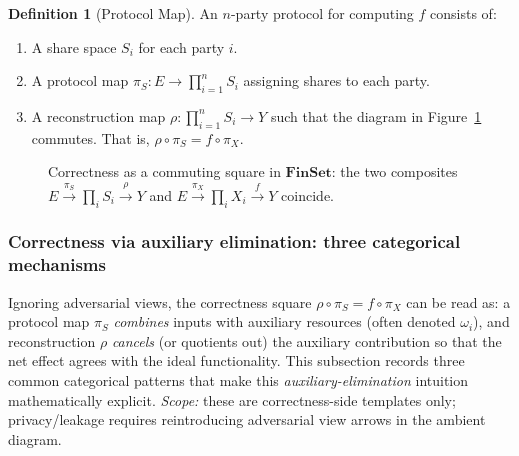 \documentclass[11pt,a4paper]{article}
\theoremstyle{definition}
\newtheorem{definition}{Definition}[section]
\theoremstyle{plain}
\begin{document}
\begin{definition}[Protocol Map]
\label{def:protocol-map}
An $n$-party protocol for computing $f$ consists of:
\begin{enumerate}
    \item A share space $S_i$ for each party $i$.
    \item A protocol map $\pi_S: E \to \prod_{i=1}^n S_i$ assigning shares to each party.
    \item A reconstruction map $\rho: \prod_{i=1}^n S_i \to Y$ such that the diagram in Figure~\ref{fig:protocol-correctness} commutes. That is, $\rho \circ \pi_S = f \circ \pi_X$.
\end{enumerate}
\begin{figure}[ht]
\centering
{}
\caption{Correctness as a commuting square in $\mathbf{FinSet}$: the two composites $E \xrightarrow{\pi_S} \prod_i S_i \xrightarrow{\rho} Y$ and $E \xrightarrow{\pi_X} \prod_i X_i \xrightarrow{f} Y$ coincide.}
\label{fig:protocol-correctness}
\end{figure}
\end{definition}

\subsubsection{Correctness via auxiliary elimination: three categorical mechanisms}
\label{subsubsec:auxiliary-elimination}
Ignoring adversarial views, the correctness square $\rho\circ \pi_S=f\circ \pi_X$ can be read as: a protocol map $\pi_S$ \emph{combines} inputs with auxiliary resources (often denoted $\omega_i$), and reconstruction $\rho$ \emph{cancels} (or quotients out) the auxiliary contribution so that the net effect agrees with the ideal functionality.
This subsection records three common categorical patterns that make this \emph{auxiliary-elimination} intuition mathematically explicit.
\emph{Scope:} these are correctness-side templates only; privacy/leakage requires reintroducing adversarial view arrows in the ambient diagram.
\end{document}
